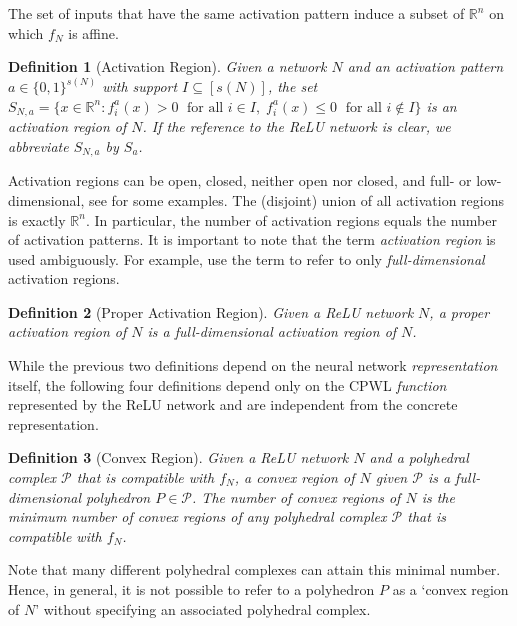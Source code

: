 \documentclass{article}
\newtheorem{definition}{Definition}
\begin{document}
The set of inputs that have the same activation pattern induce a subset of $\mathbb{R}^n$ on which $f_N$ is affine.
\begin{definition}[Activation Region]
\label{def:region1}
    Given a network $N$ and an activation pattern $a\in\{0,1\}^{s(N)}$ with support $I\subseteq [s(N)]$, the set
    $
    S_{N,a}=\{x\in \mathbb{R}^n: f_i^a(x)>0\; \text{ for all } i\in I,\; f_i^a(x) \leq 0\; \text{ for all } i\notin I\}
    $
    is an \emph{activation region} of $N$. If the reference to the ReLU network is clear, we abbreviate $S_{N,a}$ by $S_a$.
\end{definition}
Activation regions can be open, closed, neither open nor closed, and full- or low-dimensional, see  for some examples.
The (disjoint) union of all activation regions is exactly $\mathbb{R}^n$.
In particular, the number of activation regions equals the number of activation patterns.
It is important to note that the term \emph{activation region} is used ambiguously.
For example, \citet{hanin2019deep} use the term to refer to only \emph{full-dimensional} activation regions. 
\begin{definition}[Proper Activation Region]
\label{def:region2}
Given a ReLU network $N$, a \emph{proper activation region} of $N$ is a full-dimensional activation region of $N$.
\end{definition}

While the previous two definitions depend on the neural network \emph{representation} itself, the following four definitions depend only on the CPWL \emph{function} represented by the ReLU network and are independent from the concrete representation.

\begin{definition}[Convex Region]
\label{def:region3}
    Given a ReLU network $N$ and a polyhedral complex $\mathcal{P}$ that is compatible with $f_N$, a \emph{convex region of $N$ given $\mathcal{P}$} is a full-dimensional polyhedron $P\in \mathcal{P}$.
    The \emph{number of convex regions} of $N$ is the minimum number of convex regions of any polyhedral complex $\mathcal{P}$ that is compatible with $f_N$.
\end{definition}
Note that many different polyhedral complexes can attain this minimal number. Hence, in general, it is not possible to refer to a polyhedron $P$ as a `convex region of $N$' without specifying an associated polyhedral complex.
\end{document}
